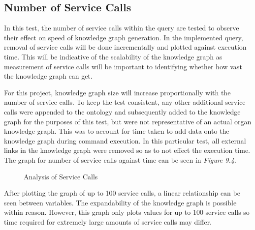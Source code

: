 \subsection{Number of Service Calls}
\hspace{0.5cm} In this test, the number of service calls within the query are tested to observe their effect on speed of knowledge graph generation. In the implemented query, removal of service calls will be done incrementally and plotted against execution time. This will be indicative of the scalability of the knowledge graph as measurement of service calls will be important to identifying whether how vast the knowledge graph can get. 

For this project, knowledge graph size will increase proportionally with the number of service calls. To keep the test consistent, any other additional service calls were appended to the ontology and subsequently added to the knowledge graph for the purposes of this test, but were not representative of an actual organ knowledge graph. This was to account for time taken to add data onto the knowledge graph during command execution. In this particular test, all external links in the knowledge graph were removed so as to not effect the execution time. The graph for number of service calls against time can be seen in \textit{Figure 9.4}.

\begin{figure}[H]
\begin{center}
\end{center}
\vspace{-0.75cm}
\caption{Analysis of Service Calls}
\end{figure}

After plotting the graph of up to 100 service calls, a linear relationship can be seen between variables. The expandability of the knowledge graph is possible within reason. However, this graph only plots values for up to 100 service calls so time required for extremely large amounts of service calls may differ. 


